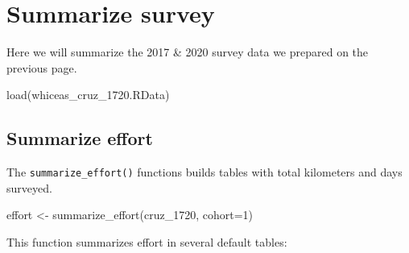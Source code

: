\documentclass[
]{book}
\newenvironment{Shaded}{\begin{snugshade}}{\end{snugshade}}
\newcommand{\AttributeTok}[1]{\textcolor[rgb]{0.77,0.63,0.00}{#1}}
\newcommand{\DecValTok}[1]{\textcolor[rgb]{0.00,0.00,0.81}{#1}}
\newcommand{\FloatTok}[1]{\textcolor[rgb]{0.00,0.00,0.81}{#1}}
\newcommand{\FunctionTok}[1]{\textcolor[rgb]{0.00,0.00,0.00}{#1}}
\newcommand{\NormalTok}[1]{#1}
\newcommand{\OtherTok}[1]{\textcolor[rgb]{0.56,0.35,0.01}{#1}}
\newcommand{\SpecialCharTok}[1]{\textcolor[rgb]{0.00,0.00,0.00}{#1}}
\newcommand{\StringTok}[1]{\textcolor[rgb]{0.31,0.60,0.02}{#1}}
\begin{document}
\begin{Shaded}
\end{Shaded}

\hypertarget{summarize}{%
\chapter{Summarize survey}\label{summarize}}

Here we will summarize the 2017 \& 2020 survey data we prepared on the previous page.

\begin{Shaded}
\begin{Highlighting}[]
\FunctionTok{load}\NormalTok{(}\StringTok{\textquotesingle{}whiceas\_cruz\_1720.RData\textquotesingle{}}\NormalTok{)}
\end{Highlighting}
\end{Shaded}

\hypertarget{summarize-effort}{%
\section*{Summarize effort}\label{summarize-effort}}

The \texttt{summarize\_effort()} functions builds tables with total kilometers and days surveyed.

\begin{Shaded}
\begin{Highlighting}[]
\NormalTok{effort }\OtherTok{\textless{}{-}} \FunctionTok{summarize\_effort}\NormalTok{(cruz\_1720,}
                           \AttributeTok{cohort=}\DecValTok{1}\NormalTok{)}
\end{Highlighting}
\end{Shaded}

This function summarizes effort in several default tables:
\end{document}
